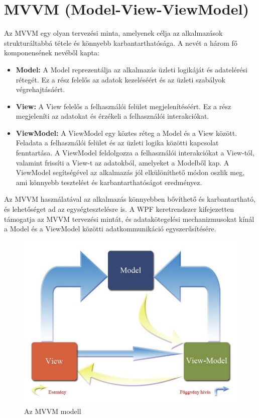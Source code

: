 \documentclass[
]{thesis-ekf}
\theoremstyle{definition}
\theoremstyle{remark}
\begin{document}
\section{MVVM (Model-View-ViewModel)}
Az MVVM egy olyan tervezési minta, amelyenek célja az alkalmazások strukturáltabbá tétele és könnyebb karbantarthatósága. A nevét a három fő komponensének nevéből kapta:
\begin{itemize}
	
	\item \textbf{Model:} A Model reprezentálja az alkalmazás üzleti logikáját és adatelérési rétegét. Ez a rész felelős az adatok kezeléséért és az üzleti szabályok végrehajtásáért.

	\item \textbf{View:} A View felelős a felhasználói felület megjelenítéséért. Ez a rész megjeleníti az adatokat és érzékeli a felhasználói interakciókat.

	\item \textbf{ViewModel:} A ViewModel egy köztes réteg a Model és a View között. Feladata a felhasználói felület és az üzleti logika közötti kapcsolat fenntartása. A ViewModel feldolgozza a felhasználói interakciókat a View-tól, valamint frissíti a View-t az adatokból, amelyeket a Modelből kap. A ViewModel segítségével az alkalmazás jól elkülöníthető módon oszlik meg, ami könnyebb tesztelést és karbantarthatóságot eredményez.
\end{itemize}
	Az MVVM használatával az alkalmazás könnyebben bővíthető és karbantartható, és lehetőséget ad az egységtesztelésre is. A WPF keretrendszer kifejezetten támogatja az MVVM tervezési mintát, és adatakötegelési mechanizmusokat kínál a Model és a ViewModel közötti adatkommunikáció egyszerűsítésére.
	\begin{figure}[!ht]
		\centering
		\includegraphics[width=12cm]{mvvm}
		\caption{Az MVVM modell \cite{Progtech}}
		\label{picture-mvvm}
	\end{figure}
\end{document}
